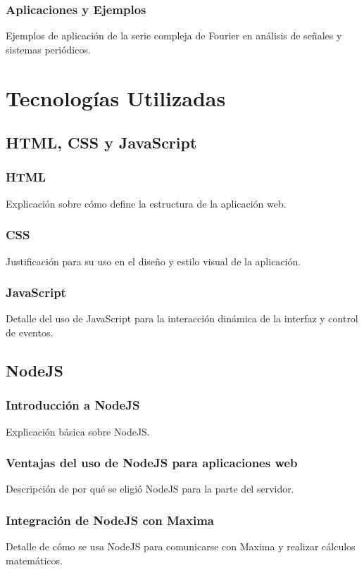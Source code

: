 \subsubsection{Aplicaciones y Ejemplos}
Ejemplos de aplicación de la serie compleja de Fourier en análisis de señales y sistemas periódicos.


\section{Tecnologías Utilizadas}

\subsection{HTML, CSS y JavaScript}
\subsubsection{HTML}
Explicación sobre cómo define la estructura de la aplicación web.
\subsubsection{CSS}
Justificación para su uso en el diseño y estilo visual de la aplicación.
\subsubsection{JavaScript}
Detalle del uso de JavaScript para la interacción dinámica de la interfaz y control de eventos.

\subsection{NodeJS}
\subsubsection{Introducción a NodeJS}
Explicación básica sobre NodeJS.
\subsubsection{Ventajas del uso de NodeJS para aplicaciones web}
Descripción de por qué se eligió NodeJS para la parte del servidor.
\subsubsection{Integración de NodeJS con Maxima}
Detalle de cómo se usa NodeJS para comunicarse con Maxima y realizar cálculos matemáticos.

